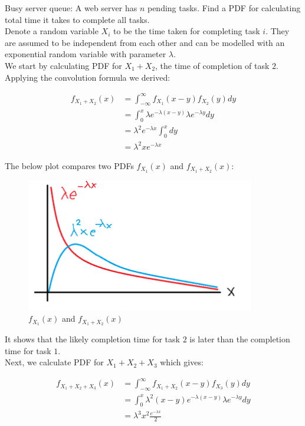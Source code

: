 \begin{texample}
	Busy server queue: A web server has $n$ pending tasks. Find a PDF for calculating total time it takes to complete all tasks. \\
	
	Denote a random variable $X_i$ to be the time taken for completing task $i$. They are assumed to be independent from each other and can be modelled with an exponential random variable with parameter $\lambda$. \\
	
	We start by calculating PDF for $X_1+X_2$, the time of completion of task $2$. Applying the convolution formula we derived:
	
	\begin{align*}
		f_{X_1+X_2}(x)&=\int_{-\infty}^\infty f_{X_1}(x-y) f_{X_2}(y) dy \\
		&=\int_0^x \lambda e^{-\lambda (x-y)} \lambda e^{-\lambda y} dy \\
		&=\lambda^2 e^{-\lambda x} \int_0^x dy \\
		&=\lambda^2 xe^{-\lambda x}
	\end{align*}
	
	The below plot compares two PDFs $f_{X_1}(x)$ and $f_{X_1+X_2}(x)$:
	
	\begin{figure}[H]
		\centering
		\includegraphics[width=100mm]{29.png}
		\caption{$f_{X_1}(x)$ and $f_{X_1+X_2}(x)$}
	\end{figure}
	
	It shows that the likely completion time for task $2$ is later than the completion time for task $1$. \\
	
	Next, we calculate PDF for $X_1+X_2+X_3$ which gives:
	
	\begin{align*}
		f_{X_1+X_2+X_3}(x)&=\int_{-\infty}^\infty f_{X_1+X_2}(x-y) f_{X_3}(y) dy \\
		&=\int_0^x \lambda^2 (x-y)e^{-\lambda (x-y)} \lambda e^{-\lambda y} dy \\
		&=\lambda^3 x^2\frac{e^{-\lambda x}}{2}
	\end{align*}
	

\end{texample}
